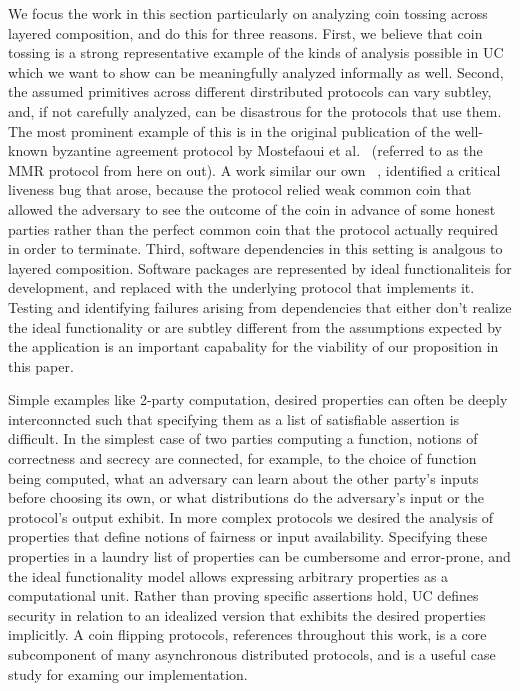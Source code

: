 We focus the work in this section particularly on analyzing coin tossing across layered composition, and do this for three reasons. 
First, we believe that coin tossing is a strong representative example of the kinds of analysis possible in UC which we want to show can be meaningfully analyzed informally as well.
Second, the assumed primitives across different dirstributed protocols can vary subtley, and, if not carefully analyzed, can be disastrous for the protocols that use them.
The most prominent example of this is in the original publication of the well-known byzantine agreement protocol by  Mostefaoui et al.~\cite{mmrog} (referred to as the MMR protocol from here on out).
A work similar our own ~\cite{byzbymc}, identified a critical liveness bug that arose, because the protocol relied weak common coin that allowed the adversary to see the outcome of the coin in advance of some honest parties rather than the perfect common coin that the protocol actually required in order to terminate. 
Third, software dependencies in this setting is analgous to layered composition. 
Software packages are represented by ideal functionaliteis for development, and replaced with the underlying protocol that implements it.
Testing and identifying failures arising from dependencies that either don't realize the ideal functionality or are subtley different from the assumptions expected by the application is an important capabality for the viability of our proposition in this paper. 


Simple examples like 2-party computation, desired properties can often be deeply interconncted such that specifying them as a list of satisfiable assertion is difficult. 
In the simplest case of two parties computing a function, notions of correctness and secrecy are connected, for example, to the choice of function being computed, what an adversary can learn about the other party's inputs before choosing its own, or what distributions do the adversary's input or the protocol's output exhibit. 
In more complex protocols we desired the analysis of properties that define notions of fairness or input availability.
Specifying these properties in a laundry list of properties can be cumbersome and error-prone, and the ideal functionality model allows expressing arbitrary properties as a computational unit.
Rather than proving specific assertions hold, UC defines security in relation to an idealized version that exhibits the desired properties implicitly.
A coin flipping protocols, references throughout this work, is a core subcomponent of many asynchronous distributed protocols, and is a useful case study for examing our implementation.

